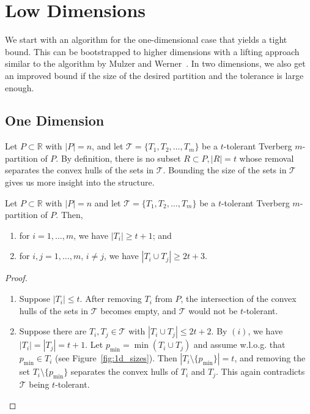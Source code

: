 \documentclass[oribibl,envcountsame,envcountsect]{llncs}
\newcommand{\mc}[1]{\ensuremath{\mathcal{#1}}}
\newcommand{\real}{\mathbb{R}}
\begin{document}
\section{Low Dimensions} \label{sec:ld}
We start with an algorithm for the one-dimensional case that yields a
tight bound. This can be bootstrapped to higher dimensions with a lifting approach
similar to the algorithm by Mulzer and Werner~\cite{Mulzer2013}. In two dimensions, we also get
an improved bound if the size of the desired partition and the
tolerance is large enough.

\subsection{One Dimension}
Let $P\subset \real$ with $|P| = n$, and let
$\mc{T}=\{T_1,T_2,\ldots,T_m\}$ be a $t$-tolerant Tverberg $m$-partition of $P$. By
definition, there is no
subset $R\subset P, |R| = t$ whose removal separates the convex hulls of the
sets in $\mc{T}$. Bounding the size of the sets in \mc{T} gives us more insight
into the structure.

\begin{lemma}\label{lem:1d_sizes}
  Let $P\subset\real$ with $|P| = n$ and let $\mc{T}=\{T_1,T_2,\ldots,T_m\}$ be
  a $t$-tolerant Tverberg $m$-partition of $P$. Then,
  \begin{enumerate}
    \renewcommand{\labelenumi}{(\roman{enumi})}
    \item for $i = 1, \ldots,m$, we have $|T_i| \geq t+1$; and
    \item for $i,j = 1, \ldots,m$, $i\neq j$, we have $|T_i \cup T_j| \geq 2t+3$.
  \end{enumerate}
\end{lemma}
\begin{proof}
  \begin{enumerate}
    \renewcommand{\labelenumi}{(\roman{enumi})}
    \item Suppose $|T_i| \leq t$. After removing $T_i$ from $P$, the
          intersection of the convex hulls of the sets in $\mc{T}$ becomes empty,
          and $\mc{T}$ would not be $t$-tolerant.
    \item Suppose there are  $T_i, T_j\in\mc{T}$ with $|T_i \cup
    T_j| \leq 2t+2$. By $(i)$, we have $|T_i|=|T_j|=t+1$.
    Let $p_{\min} = \min(T_i\cup T_j)$ and assume w.l.o.g. that $p_{\min} \in T_i$
    (see Figure~\ref{fig:1d_sizes}).
    Then $|T_i \setminus \{p_{\min}\}| = t$, and removing the set $T_i
    \setminus \{p_{\min}\}$ separates the convex hulls of $T_i$ and $T_j$.
    This again contradicts  $\mc{T}$ being $t$-tolerant.
  \end{enumerate}
\end{proof}
\end{document}
